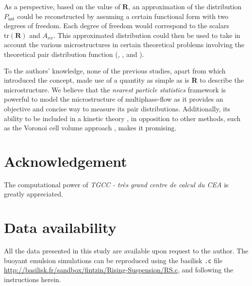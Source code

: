 As a perspective, based on the value of $\textbf{R}$, an approximation of the distribution $P_\text{nst}$ could be reconstructed by assuming a certain functional form with two degrees of freedom.
Each degree of freedom would correspond to the scalars $\text{tr}(\textbf{R})$ and $A_{xx}$.
This approximated distribution could then be used to take in account the various microstructures in certain theoretical problems involving the theoretical pair distribution function (\citet{batchelor1972sedimentation}, \citet{hinch1977averaged}, and \citet{zhang2021ensemble}).

To the authors' knowledge, none of the previous studies, apart from \citet{zhang2023evolution} which introduced the concept, made use of a quantity as simple as is \textbf{R} to describe the microstructure. 
We believe that the \textit{nearest particle statistics} framework is powerful to model the microstructure of multiphase-flow as it provides an objective and concise way to measure its pair distributions. 
Additionally, its ability to be included in a kinetic theory \citep{zhang2023evolution}, in opposition to other methods,  such as the Voronoi cell volume approach \citep{senthil2005voronoi}, makes it promising. 

\section*{Acknowledgement}

The computational power of  \textit{TGCC - tr\`es grand centre de calcul du CEA} is greatly appreciated. 
\section*{Data availability}

All the data presented in this study are available upon request to the author. 
The buoyant emulsion simulations can be reproduced using the basilisk \texttt{.c} file \url{http://basilisk.fr/sandbox/fintzin/Rising-Suspension/RS.c}, and following the instructions herein. 
